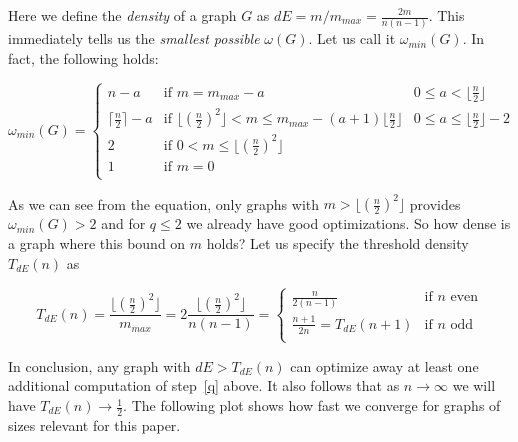 \documentclass[a4paper]{article}
\begin{document}
Here we define the \emph{density} of a graph $G$ as $dE = m/m_{max} = \frac{2m}{n(n-1)}$. This immediately tells us the \emph{smallest possible} $\omega(G)$. Let us call it $\omega_{min}(G)$. In fact, the following holds:

\begin{equation}\label{omega}
\omega_{min}(G) = \left\{ \begin{array}{lll}
                           n - a & \text{if } m = m_{max} - a & 0 \leq a < \lfloor\frac{n}{2}\rfloor \\
                           \lceil\frac{n}{2}\rceil - a & \text{if } \lfloor(\frac{n}{2})^2\rfloor < m \leq m_{max} - (a + 1)\lfloor\frac{n}{2}\rfloor & 0 \leq a \leq \lfloor\frac{n}{2}\rfloor - 2 \\
                           2 & \text{if } 0 < m \leq \lfloor(\frac{n}{2})^2\rfloor & \\
                           1 & \text{if } m = 0 & \\
                          \end{array}
                  \right.
\end{equation}

As we can see from the equation, only graphs with $m > \lfloor(\frac{n}{2})^2\rfloor$ provides $\omega_{min}(G) > 2$ and for $q \leq 2$ we already have good optimizations. So how dense is a graph where this bound on $m$ holds? Let us specify the threshold density $T_{dE}(n)$ as

$$
T_{dE}(n) = \frac{\lfloor(\frac{n}{2})^2\rfloor}{m_{max}} = 2\frac{\lfloor(\frac{n}{2})^2\rfloor}{n(n-1)} = \left\{ \begin{array}{ll}
          \frac{n}{2(n-1)} & \text{if } n \text{ even}\\
          \frac{n + 1}{2n} = T_{dE}(n+1) & \text{if } n \text{ odd}\\
          \end{array}
  \right.
$$

In conclusion, any graph with $dE > T_{dE}(n)$ can optimize away at least one additional computation of step~\ref{q} above. It also follows that as $n \rightarrow \infty$ we will have $T_{dE}(n) \rightarrow \frac{1}{2}$. The following plot shows how fast we converge for graphs of sizes relevant for this paper.

\begin{center}
\end{center}
\end{document}
